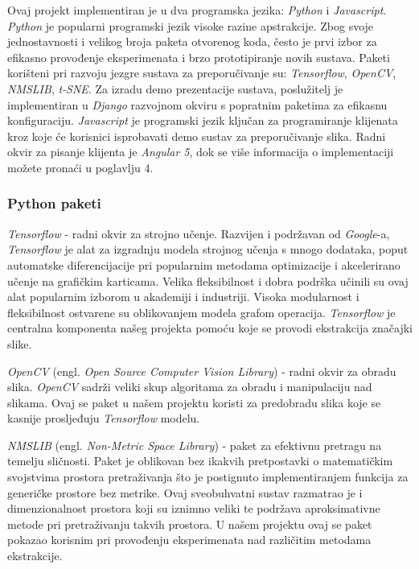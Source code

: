 \documentclass[times, utf8, proizvoljni, numeric]{fer}
\begin{document}
Ovaj projekt implementiran je u dva programska jezika: \textit{Python} i \textit{Javascript}. 
\textit{Python} je popularni programski jezik visoke razine apstrakcije. Zbog svoje jednostavnosti i velikog broja paketa otvorenog koda, često je prvi izbor za efikasno provođenje eksperimenata i brzo prototipiranje novih sustava. Paketi korišteni pri razvoju jezgre sustava za preporučivanje su: \textit{Tensorflow}, \textit{OpenCV}, \textit{NMSLIB}, \textit{t-SNE}. Za izradu demo prezentacije sustava, poslužitelj je implementiran u \textit{Django} razvojnom okviru s popratnim paketima za efikasnu konfiguraciju. 
\textit{Javascript} je programski jezik ključan za programiranje klijenata kroz koje će korisnici isprobavati demo sustav za preporučivanje slika. Radni okvir za pisanje klijenta je \textit{Angular 5}, dok se više informacija o implementaciji možete pronaći u poglavlju 4.

\subsubsection{Python paketi }

\textit{Tensorflow} \cite{tensorflow2015-whitepaper} - radni okvir za strojno učenje. Razvijen i podržavan od \textit{Google}-a, \textit{Tensorflow} je alat za izgradnju modela strojnog učenja s mnogo dodataka, poput automatske diferencijacije pri popularnim metodama optimizacije i akcelerirano učenje na grafičkim karticama. Velika fleksibilnost i dobra podrška učinili su ovaj alat popularnim izborom u akademiji i industriji. Visoka modularnost i fleksibilnost ostvarene su oblikovanjem modela grafom operacija.
\textit{Tensorflow} je centralna komponenta našeg projekta pomoću koje se provodi ekstrakcija značajki slike.

\textit{OpenCV} (engl. \textit{Open Source Computer Vision Library}) \cite{itseez2015opencv} - radni okvir za obradu slika. \textit{OpenCV} sadrži veliki skup algoritama za obradu i manipulaciju nad slikama. Ovaj se paket u našem projektu koristi za predobradu slika koje se kasnije prosljeđuju \textit{Tensorflow} modelu.


\textit{NMSLIB} (engl. \textit{Non-Metric Space Library})\cite{NMSLIB} - paket za efektivnu pretragu na temelju sličnosti. Paket je oblikovan bez ikakvih pretpostavki o matematičkim svojstvima prostora pretraživanja što je postignuto implementiranjem funkcija za generičke prostore bez metrike. Ovaj sveobuhvatni sustav razmatrao je i dimenzionalnost prostora koji su iznimno veliki te podržava aproksimativne metode pri pretraživanju takvih prostora. U našem projektu ovaj se paket pokazao korisnim pri provođenju eksperimenata nad različitim metodama ekstrakcije. 
\end{document}
